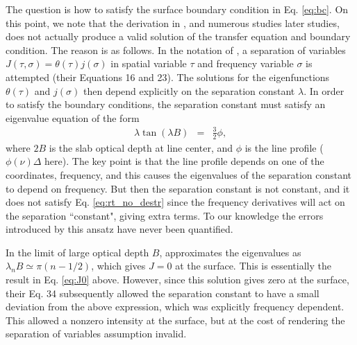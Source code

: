 \documentclass{aastex63}
\newcommand{\be}{\begin{eqnarray}}
\newcommand{\ee}{\end{eqnarray}}
\begin{document}
The question is how to satisfy the surface boundary condition in Eq. \ref{eq:bc}. On this point, we note that the derivation in \citet{1973MNRAS.162...43H}, and numerous studies later studies, does not actually produce a valid solution of the transfer equation and boundary condition. The reason is as follows. In the notation of \citet{1973MNRAS.162...43H}, a separation of variables
$J(\tau,\sigma) = \theta(\tau) j(\sigma)$ in spatial variable $\tau$ and frequency variable $\sigma$ is attempted (their Equations 16 and 23). The solutions for the eigenfunctions $\theta(\tau)$ and $j(\sigma)$ then depend explicitly on the separation constant $\lambda$. In order to satisfy the boundary conditions, the separation constant must satisfy an eigenvalue equation of the form
\be
\lambda \tan(\lambda B) & = & \frac{3}{2} \phi,
\label{eq:evalue}
\ee
where $2B$ is the slab optical depth at line center, and $\phi$ is the line profile ($\phi(\nu)\Delta$ here). The key point is that the line profile depends on one of the coordinates, frequency, and this causes the eigenvalues of the separation constant to depend on frequency. But then the separation constant is not constant, and it does not satisfy Eq. \ref{eq:rt_no_destr} since the frequency derivatives will act on the separation ``constant", giving extra terms. To our knowledge the errors introduced by this ansatz have never been quantified. 

In the limit of large optical depth $B$, \citealt{1973MNRAS.162...43H} approximates the eigenvalues as $\lambda_n B \simeq \pi (n-1/2)$, which gives $J=0$ at the surface. This is essentially the result in Eq. \ref{eq:J0} above. However, since this solution gives zero at the surface, their Eq. 34 subsequently allowed the separation constant to have a small deviation from the above expression, which was explicitly frequency dependent. This allowed a nonzero intensity at the surface, but at the cost of rendering the separation of variables assumption invalid. 

\end{document}
